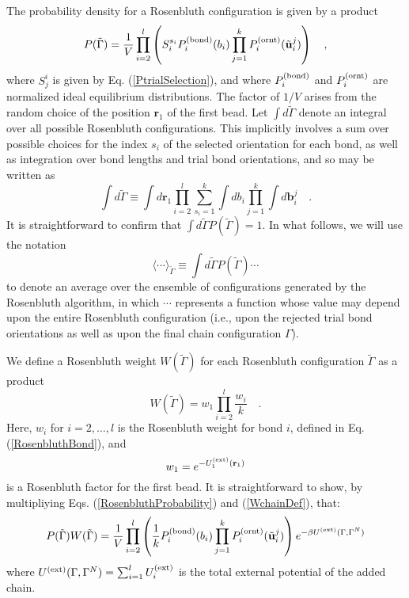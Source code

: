 \documentclass[12pt]{article}
\newcommand{\vv}[1]{\mathbf{#1}}
\newcommand\system{\Gamma^{N}}
\newcommand\chain{\Gamma}
\newcommand\Uext{U^{({\rm ext})}}
\newcommand\vbead{\vv{r}}
\newcommand\qbead{\vv{r}_{1}}
\newcommand\nbead{l}
\newcommand\vbond{\vv{b}}
\newcommand\rbond{b}
\newcommand\ntrial{k}
\newcommand\utrial{\tilde{\vv{u}}}
\newcommand\Pbond{P^{({\rm bond})}}
\newcommand\Pornt{P^{({\rm ornt})}}
\newcommand\rconfig{\tilde{\chain}}
\begin{document}
The probability density for a Rosenbluth configuration is given by a product 
\begin{equation}
   P(\rconfig) = \frac{1}{V}
                 \prod_{i=2}^{\nbead} \left (
                 S^{s_{i}}_{i}
                 \Pbond_{i}(\rbond_{i})
                 \prod_{j=1}^{\ntrial}
                 \Pornt_{i}(\utrial_{i}^{j}) \right )
   \quad, \label{RosenbluthProbability}
\end{equation} 
where $S_{j}^{i}$ is given by Eq. (\ref{PtrialSelection}), and where $\Pbond_{i}$ and $\Pornt_{i}$ are normalized ideal equilibrium distributions.  The factor of $1/V$ arises from the random choice of the position $\vbead_{1}$ of the first bead.  Let $\int d\rconfig$ denote an integral over all possible Rosenbluth configurations. This implicitly involves a sum over possible choices for the index $s_{i}$ of the selected orientation for each bond, as well as integration over bond lengths and trial bond orientations, and so may be written as
\begin{equation}
    \int d\rconfig \equiv 
                   \int d\qbead
                   \prod_{i=2}^{\nbead} 
                   \sum_{s_{i}=1}^{\ntrial}
                   \int d\rbond_{i}
                   \prod_{j=1}^{\ntrial}
                   \int d\vbond_{i}^{j}
                   \quad.
\end{equation}
It is straightforward to confirm that $\int d\rconfig P(\rconfig) = 1$. 
In what follows, we will use the notation
\begin{equation}
   \langle \cdots \rangle_{\rconfig} \equiv
   \int d\rconfig P(\rconfig) \cdots
\end{equation}
to denote an average over the ensemble of configurations generated by the Rosenbluth algorithm, in which $\cdots$ represents a function whose value may depend upon the entire Rosenbluth configuration (i.e., upon the rejected trial bond orientations as well as upon the final chain configuration $\chain$).

We define a Rosenbluth weight $W(\rconfig)$ for each Rosenbluth configuration $\rconfig$ as a product
\begin{equation}
   W(\rconfig) = w_{1} \prod_{i=2}^{\nbead} \frac{w_{i}}{k}
   \quad. \label{WchainDef}
\end{equation}
Here, $w_{i}$ for $i=2,\ldots,\nbead$ is the Rosenbluth weight for bond $i$, defined in Eq. (\ref{RosenbluthBond}), and 
\begin{equation}
   w_{1} = e^{-\Uext_{1}(\vbead_{1})} 
\end{equation}
is a Rosenbluth factor for the first bead. It is straightforward to show, by multipliying Eqs. (\ref{RosenbluthProbability}) and (\ref{WchainDef}), that: 
\begin{equation}
   P(\rconfig)W(\rconfig) 
   = \frac{1}{V} 
   \prod_{i=2}^{\nbead} \left (
   \frac{1}{k}
   \Pbond_{i}(\rbond_{i})
   \prod_{j=1}^{\ntrial}
   \Pornt_{i}(\utrial_{i}^{j}) \right )
   e^{-\beta\Uext(\chain,\system)}
   \label{PWRosenbluthProduct}
\end{equation}
where $\Uext(\chain, \system) = \sum_{i=1}^{\nbead} \Uext_{i}$ is the total external potential of the added chain.
\end{document}
